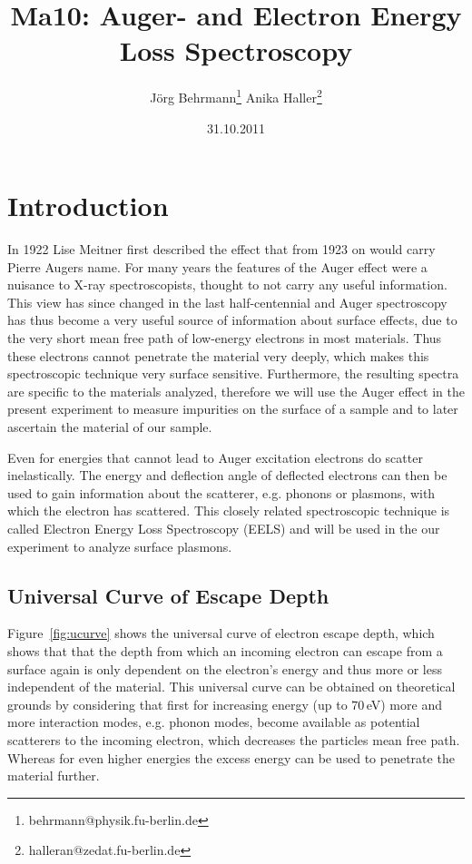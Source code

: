 \documentclass[a4paper,10pt]{scrartcl}
\begin{document}
\title{Ma10: Auger- and Electron Energy Loss Spectroscopy}
\author{J\"org Behrmann\footnote{behrmann@physik.fu-berlin.de} \qquad Anika Haller\footnote{halleran@zedat.fu-berlin.de}}
\date{31.10.2011}
\maketitle
\tableofcontents
\thispagestyle{empty}

\clearpage

\section{Introduction}

In 1922 Lise Meitner first described the effect that from 1923 on would carry Pierre Augers name. For many years the features of the Auger effect were a nuisance to X-ray spectroscopists, thought to not carry any useful information. This view has since changed in the last half-centennial and Auger spectroscopy has thus become a very useful source of information about surface effects, due to the very short mean free path of low-energy electrons in most materials. Thus these electrons cannot penetrate the material very deeply, which makes this spectroscopic technique very surface sensitive. Furthermore, the resulting spectra are specific to the materials analyzed, therefore we will use the Auger effect in the present experiment to measure impurities on the surface of a sample and to later ascertain the material of our sample.

Even for energies that cannot lead to Auger excitation electrons do scatter inelastically. The energy and deflection angle of deflected electrons can then be used to gain information about the scatterer, e.g. phonons or plasmons, with which the electron has scattered. This closely related spectroscopic technique is called Electron Energy Loss Spectroscopy (EELS) and will be used in the our experiment to analyze surface plasmons.

\subsection{Universal Curve of Escape Depth}

Figure~\ref{fig:ucurve} shows the universal curve of electron escape depth, which shows that that the depth from which an incoming electron can escape from a surface again is only dependent on the electron's energy and thus more or less independent of the material. This universal curve can be obtained on theoretical grounds by considering that first for increasing energy (up to $70\,$eV) more and more interaction modes, e.g. phonon modes, become available as potential scatterers to the incoming electron, which decreases the particles mean free path. Whereas for even higher energies the excess energy can be used to penetrate the material further.
\end{document}
